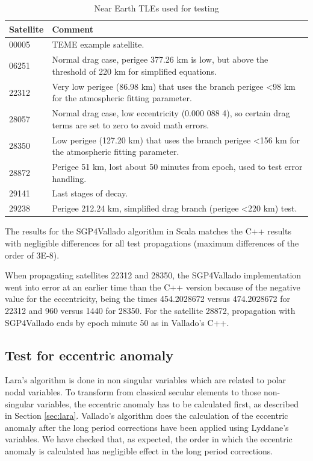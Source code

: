 \documentclass{article}
\begin{document}
\begin{table}[!htbp]
\centering
\caption{Near Earth TLEs used for testing}\vspace{2mm}
\begin{tabular}{ll}
\hline
Satellite & Comment \\
\hline
00005 & TEME example satellite.\\
06251 & Normal drag case, perigee 377.26 km is low, but above the threshold of 220 km for simplified equations.\\
22312 & Very low perigee (86.98 km) that uses the branch perigee \textless 98 km for the atmospheric fitting parameter.\\
28057 & Normal drag case, low eccentricity (0.000 088 4), so certain drag terms are set to zero to avoid math errors.\\
28350 & Low perigee (127.20 km) that uses the branch perigee \textless 156 km for the atmospheric fitting parameter.\\
28872 & Perigee 51 km, lost about 50 minutes from epoch, used to test error handling.\\
29141 & Last stages of decay.\\
29238 & Perigee 212.24 km, simplified drag branch (perigee \textless 220 km) test.\\
\hline
\end{tabular}
\label{tab:res}
\end{table}

The results for the SGP4Vallado algorithm in Scala matches the C++ results with negligible differences for all test propagations (maximum differences of the order of 3E-8).

When propagating satellites 22312 and 28350, the SGP4Vallado implementation went into error at an earlier time
than the C++ version because of the negative value for the eccentricity, being the times 454.2028672 versus 474.2028672 for 22312 and 960 versus 1440 for 28350.
For the satellite 28872, propagation with SGP4Vallado ends by epoch minute 50 as in Vallado's C++.

\subsection{Test for eccentric anomaly}
\label{sec:trueanomaly}

Lara's algorithm is done in non singular variables which are related to polar nodal variables.
To transform from classical secular elements to those non-singular variables, the eccentric anomaly has to be calculated first, as described in Section \ref{sec:lara}.
Vallado's algorithm does the calculation of the eccentric anomaly after the long period corrections have been applied using Lyddane's variables.
We have checked that, as expected, the order in which the eccentric anomaly is calculated has negligible effect in the long period corrections.
\end{document}
